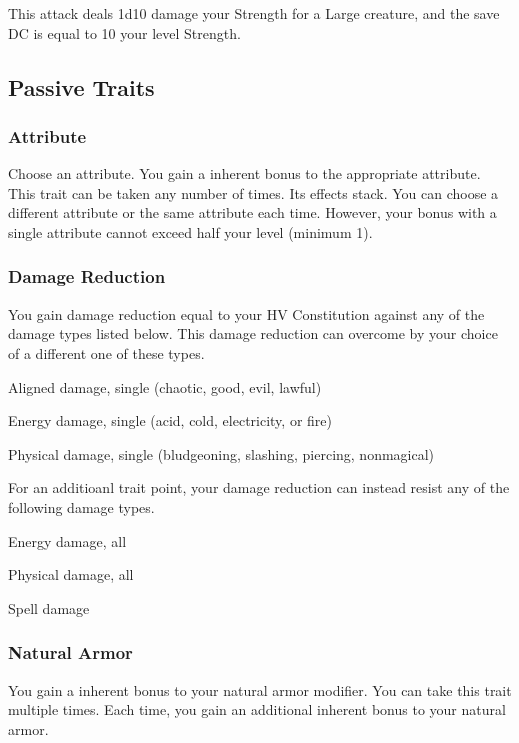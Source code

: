This attack deals 1d10 damage \add your Strength for a Large creature, and the save DC is equal to 10 \add your level \add Strength.

\subsection{Passive Traits}

\subsubsection{Attribute}
Choose an attribute.
\featben You gain a  inherent bonus to the appropriate attribute.
 This trait can be taken any number of times. Its effects stack. You can choose a different attribute or the same attribute each time. However, your bonus with a single attribute cannot exceed half your level (minimum 1).

\subsubsection{Damage Reduction}
\featben You gain damage reduction equal to your HV \add Constitution against any of the damage types listed below. This damage reduction can overcome by your choice of a different one of these types.
\begin{itemize*}
    \item Aligned damage, single (chaotic, good, evil, lawful)
    \item Energy damage, single (acid, cold, electricity, or fire)
    \item Physical damage, single (bludgeoning, slashing, piercing, nonmagical)
\end{itemize*}
 For an additioanl trait point, your damage reduction can instead resist any of the following damage types.
\begin{itemize*}
    \item Energy damage, all
    \item Physical damage, all
    \item Spell damage
\end{itemize*}

\subsubsection{Natural Armor}
\featben You gain a  inherent bonus to your natural armor modifier.
 You can take this trait multiple times. Each time, you gain an additional  inherent bonus to your natural armor.

